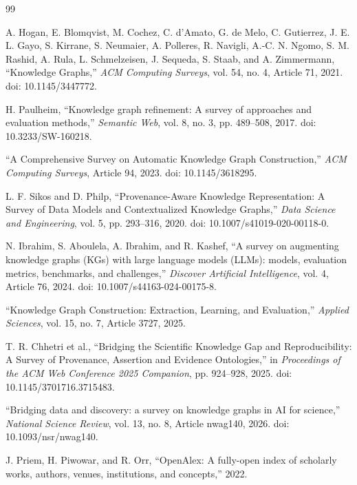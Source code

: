 \documentclass[11pt,a4paper]{article}
\begin{document}
\begin{thebibliography}{99}

A. Hogan, E. Blomqvist, M. Cochez, C. d'Amato, G. de Melo, C. Gutierrez, J. E. L. Gayo, S. Kirrane, S. Neumaier, A. Polleres, R. Navigli, A.-C. N. Ngomo, S. M. Rashid, A. Rula, L. Schmelzeisen, J. Sequeda, S. Staab, and A. Zimmermann,
``Knowledge Graphs,''
\textit{ACM Computing Surveys}, vol. 54, no. 4, Article 71, 2021.
doi: 10.1145/3447772.

H. Paulheim,
``Knowledge graph refinement: A survey of approaches and evaluation methods,''
\textit{Semantic Web}, vol. 8, no. 3, pp. 489--508, 2017.
doi: 10.3233/SW-160218.

``A Comprehensive Survey on Automatic Knowledge Graph Construction,''
\textit{ACM Computing Surveys}, Article 94, 2023.
doi: 10.1145/3618295.

L. F. Sikos and D. Philp,
``Provenance-Aware Knowledge Representation: A Survey of Data Models and Contextualized Knowledge Graphs,''
\textit{Data Science and Engineering}, vol. 5, pp. 293--316, 2020.
doi: 10.1007/s41019-020-00118-0.

N. Ibrahim, S. Aboulela, A. Ibrahim, and R. Kashef,
``A survey on augmenting knowledge graphs (KGs) with large language models (LLMs): models, evaluation metrics, benchmarks, and challenges,''
\textit{Discover Artificial Intelligence}, vol. 4, Article 76, 2024.
doi: 10.1007/s44163-024-00175-8.

``Knowledge Graph Construction: Extraction, Learning, and Evaluation,''
\textit{Applied Sciences}, vol. 15, no. 7, Article 3727, 2025.

T. R. Chhetri et al.,
``Bridging the Scientific Knowledge Gap and Reproducibility: A Survey of Provenance, Assertion and Evidence Ontologies,''
in \textit{Proceedings of the ACM Web Conference 2025 Companion}, pp. 924--928, 2025.
doi: 10.1145/3701716.3715483.

``Bridging data and discovery: a survey on knowledge graphs in AI for science,''
\textit{National Science Review}, vol. 13, no. 8, Article nwag140, 2026.
doi: 10.1093/nsr/nwag140.

J. Priem, H. Piwowar, and R. Orr,
``OpenAlex: A fully-open index of scholarly works, authors, venues, institutions, and concepts,''
2022.

\end{thebibliography}
\end{document}
